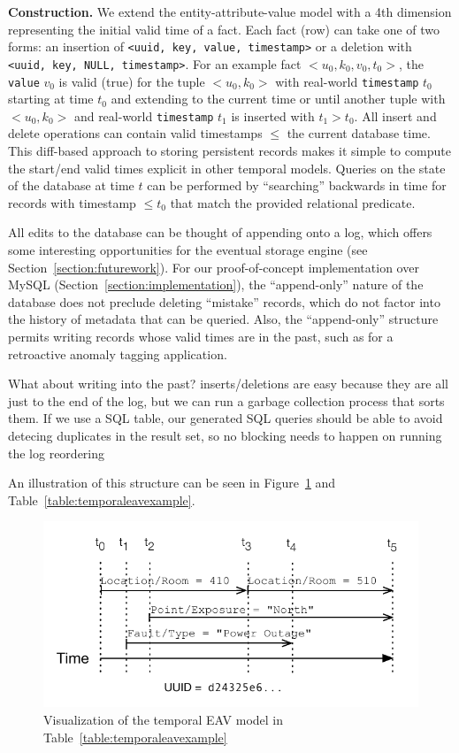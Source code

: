 \textbf{Construction.} We extend the entity-attribute-value model with a 4th dimension representing the initial
valid time of a fact. Each fact (row) can take one of two forms: an insertion of \texttt{<uuid, key, value, timestamp>}
or a deletion with \texttt{<uuid, key, NULL, timestamp>}. For an example fact $<u_0, k_0, v_0, t_0>$, the \texttt{value} $v_0$ is valid (true) for the tuple $<u_0, k_0>$
with real-world \texttt{timestamp} $t_0$ starting at time $t_0$ and extending to the current time or until another
tuple with $<u_0, k_0>$ and real-world \texttt{timestamp} $t_1$ is inserted with $t_1 > t_0$. All insert and delete operations
can contain valid timestamps $\leq$ the current database time. This diff-based approach
to storing persistent records makes it simple to compute the start/end valid times explicit in other temporal models.
Queries on the state of the database at time $t$ can be performed by ``searching'' backwards in time for
records with timestamp $\leq t_0$ that match the provided relational predicate.

All edits to the database can be thought of appending onto a log, which offers some interesting opportunities
for the eventual storage engine (see Section~\ref{section:futurework}). For our proof-of-concept implementation
over MySQL (Section~\ref{section:implementation}), the ``append-only'' nature of the database does not preclude
deleting ``mistake'' records, which do not factor into the history of metadata that can be queried. Also,
the ``append-only'' structure permits writing records whose valid times are in the past, such as for a retroactive anomaly
tagging application.

What about writing into the past? inserts/deletions are easy because they are all just to the end of the log, but
we can run a garbage collection process that sorts them. If we use a SQL table, our generated SQL queries should
be able to avoid detecing duplicates in the result set, so no blocking needs to happen on running the log reordering
\fi

An illustration of this structure can be seen in Figure~\ref{figure:temporaleavexample} and Table~\ref{table:temporaleavexample}.

\begin{figure}
\centering
\includegraphics[width=.9\linewidth]{figs/time.pdf}
\caption{Visualization of the temporal EAV model in Table~\ref{table:temporaleavexample}}
\label{figure:temporaleavexample}
\end{figure}

